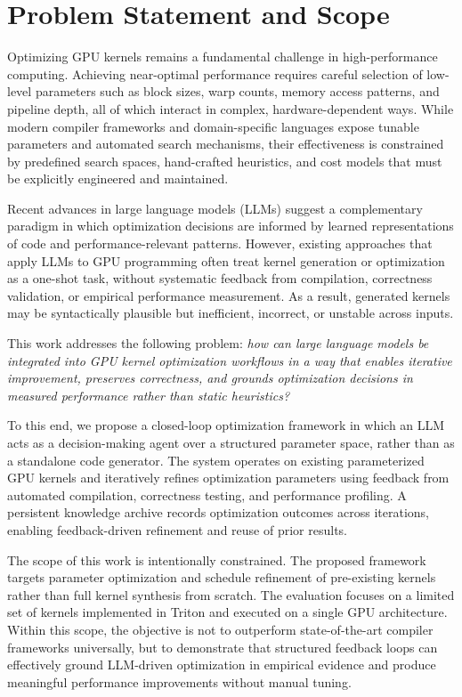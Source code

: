 \documentclass{article}
\begin{document}
\section{Problem Statement and Scope}

Optimizing GPU kernels remains a fundamental challenge in high-performance computing. Achieving near-optimal performance requires careful selection of low-level parameters such as block sizes, warp counts, memory access patterns, and pipeline depth, all of which interact in complex, hardware-dependent ways. While modern compiler frameworks and domain-specific languages expose tunable parameters and automated search mechanisms, their effectiveness is constrained by predefined search spaces, hand-crafted heuristics, and cost models that must be explicitly engineered and maintained.

Recent advances in large language models (LLMs) suggest a complementary paradigm in which optimization decisions are informed by learned representations of code and performance-relevant patterns. However, existing approaches that apply LLMs to GPU programming often treat kernel generation or optimization as a one-shot task, without systematic feedback from compilation, correctness validation, or empirical performance measurement. As a result, generated kernels may be syntactically plausible but inefficient, incorrect, or unstable across inputs.

This work addresses the following problem: \emph{how can large language models be integrated into GPU kernel optimization workflows in a way that enables iterative improvement, preserves correctness, and grounds optimization decisions in measured performance rather than static heuristics?}

To this end, we propose a closed-loop optimization framework in which an LLM acts as a decision-making agent over a structured parameter space, rather than as a standalone code generator. The system operates on existing parameterized GPU kernels and iteratively refines optimization parameters using feedback from automated compilation, correctness testing, and performance profiling. A persistent knowledge archive records optimization outcomes across iterations, enabling feedback-driven refinement and reuse of prior results.

The scope of this work is intentionally constrained. The proposed framework targets parameter optimization and schedule refinement of pre-existing kernels rather than full kernel synthesis from scratch. The evaluation focuses on a limited set of kernels implemented in Triton and executed on a single GPU architecture. Within this scope, the objective is not to outperform state-of-the-art compiler frameworks universally, but to demonstrate that structured feedback loops can effectively ground LLM-driven optimization in empirical evidence and produce meaningful performance improvements without manual tuning.
\end{document}
